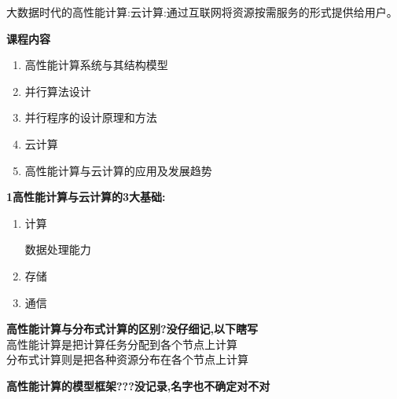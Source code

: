 \documentclass[UTF8,a4paper]{ctexart}
\newcommand{\spaceline}{\vspace{\baselineskip}}
\begin{document}
  大数据时代的高性能计算:云计算:通过互联网将资源按需服务的形式提供给用户。

  \spaceline
  \textbf{课程内容}
  \begin{enumerate}
    \item 高性能计算系统与其结构模型
    \item 并行算法设计
    \item 并行程序的设计原理和方法
    \item 云计算
    \item 高性能计算与云计算的应用及发展趋势
  \end{enumerate}

  \spaceline
  \textbf{1高性能计算与云计算的3大基础:}
  \begin{enumerate}
    \item 计算

    数据处理能力

    \item 存储

    \item 通信
  \end{enumerate}

  \spaceline
  \textbf{高性能计算与分布式计算的区别?没仔细记,以下瞎写}\\
  高性能计算是把计算任务分配到各个节点上计算\\
  分布式计算则是把各种资源分布在各个节点上计算

  \spaceline
  \textbf{高性能计算的模型框架???没记录,名字也不确定对不对}
\end{document}
